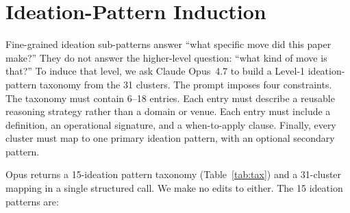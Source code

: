 \documentclass[10pt,a4paper]{article}
\begin{document}
\section{Ideation-Pattern Induction}
\label{sec:methodology}

Fine-grained ideation sub-patterns answer ``what specific move did this paper make?'' They do not answer the higher-level question: ``what kind of move is that?'' To induce that level, we ask Claude Opus~4.7 to build a Level-1 ideation-pattern taxonomy from the 31 clusters. The prompt imposes four constraints. The taxonomy must contain 6--18 entries. Each entry must describe a reusable reasoning strategy rather than a domain or venue. Each entry must include a definition, an operational signature, and a when-to-apply clause. Finally, every cluster must map to one primary ideation pattern, with an optional secondary pattern.

Opus returns a 15-ideation pattern taxonomy (Table~\ref{tab:tax}) and a 31-cluster mapping in a single structured call. We make no edits to either. The 15 ideation patterns are:
\end{document}
